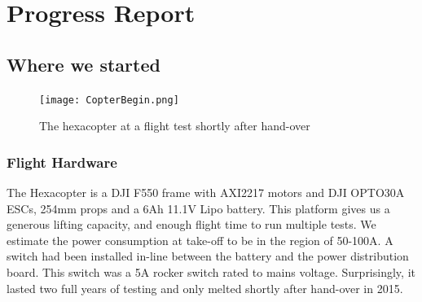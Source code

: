 \documentclass[a4paper, 11pt, titlepage]{article}
\begin{document}
  



  \section{Progress Report}
  \subsection{Where we started}
      \begin{figure}[h!]
        \centering
        \texttt{[image: CopterBegin.png]}
        \caption{The hexacopter at a flight test shortly after hand-over}
      \end{figure}
    \subsubsection{Flight Hardware}
      The Hexacopter is a DJI F550 frame with AXI2217 motors and DJI OPTO30A ESCs, 254mm props and a 6Ah 11.1V Lipo battery.
      This platform gives us a generous lifting capacity, and enough flight time to run multiple tests.
      We estimate the power consumption at take-off to be in the region of 50-100A.  A switch had been installed in-line between the battery and the power distribution board. This switch was a 5A rocker switch rated to mains voltage.  Surprisingly, it lasted two full years of testing and only melted shortly after hand-over in 2015.
\end{document}
